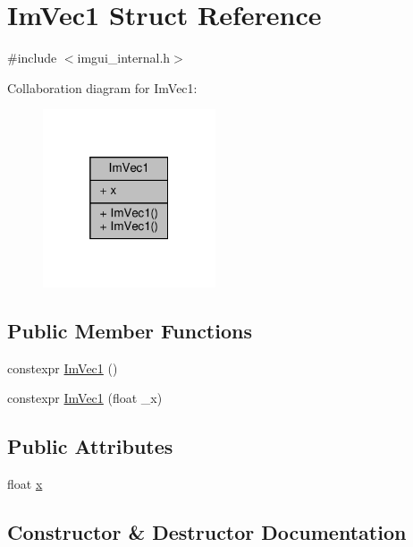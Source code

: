 \hypertarget{structImVec1}{}\section{Im\+Vec1 Struct Reference}
\label{structImVec1}


{\ttfamily \#include $<$imgui\+\_\+internal.\+h$>$}



Collaboration diagram for Im\+Vec1\+:
\nopagebreak
\begin{figure}[H]
\begin{center}
\leavevmode
\includegraphics[width=145pt]{structImVec1__coll__graph}
\end{center}
\end{figure}
\subsection*{Public Member Functions}
\begin{DoxyCompactItemize}
\item 
constexpr \hyperlink{structImVec1_a8f545eae291c5fc6d94008ce4137328a}{Im\+Vec1} ()
\item 
constexpr \hyperlink{structImVec1_a1093e56497fc272e1c46eac72e567503}{Im\+Vec1} (float \+\_\+x)
\end{DoxyCompactItemize}
\subsection*{Public Attributes}
\begin{DoxyCompactItemize}
\item 
float \hyperlink{structImVec1_a825500197aa4fe7c4aa563ae547fd29b}{x}
\end{DoxyCompactItemize}


\subsection{Constructor \& Destructor Documentation}
\mbox{\label{structImVec1_a8f545eae291c5fc6d94008ce4137328a}} 

